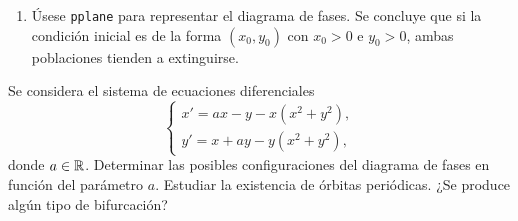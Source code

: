 \documentclass[11pt]{report}
\begin{document}
\begin{solution}
\begin{enumerate}
        \item Úsese \texttt{pplane} para representar el diagrama de fases. Se concluye que si la condición inicial es de la forma $(x_0,y_0)$ con $x_0>0$ e $y_0>0$, ambas poblaciones tienden a extinguirse.
    \end{enumerate}
\end{solution}

\begin{exercise}[Junio de 2022]
    Se considera el sistema de ecuaciones diferenciales
    \[\begin{cases}
        x' = ax-y-x(x^2+y^2), \\
        y' = x+ay-y(x^2+y^2),
    \end{cases}\]
    donde $a\in\mathbb R$. Determinar las posibles configuraciones del diagrama de fases en función del parámetro $a$. Estudiar la existencia de órbitas periódicas. ¿Se produce algún tipo de bifurcación?
\end{exercise}
\end{document}
